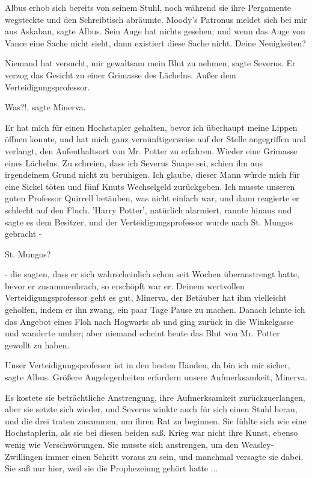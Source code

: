 Albus erhob sich bereits von seinem Stuhl, noch während sie ihre Pergamente
wegsteckte und den Schreibtisch abräumte. \glqq{}Moody's Patronus meldet sich bei
mir aus Askaban\grqq{}, sagte Albus. \glqq{}Sein Auge hat nichts gesehen; und
wenn das Auge von Vance eine Sache nicht sieht, dann existiert diese Sache
nicht. Deine Neuigkeiten?\grqq{}

\glqq{}Niemand hat versucht, mir gewaltsam mein Blut zu nehmen\grqq{}, sagte
Severus. Er verzog das Gesicht zu einer Grimasse des Lächelns. \glqq{}Außer dem
Verteidigungsprofessor.\grqq{}

\glqq{}Was?!\grqq{}, sagte Minerva.

\glqq{}Er hat mich für einen Hochstapler gehalten, bevor ich überhaupt meine
Lippen öffnen konnte, und hat mich ganz vernünftigerweise auf der Stelle
angegriffen und verlangt, den Aufenthaltsort von Mr. Potter zu erfahren.\grqq{}
Wieder eine Grimasse eines Lächelns. \glqq{}Zu schreien, dass ich Severus Snape
sei, schien ihn aus irgendeinem Grund nicht zu beruhigen. Ich glaube, dieser
Mann würde mich für eine Sickel töten und fünf Knuts Wechselgeld zurückgeben.
Ich musste unseren guten Professor Quirrell betäuben, was nicht einfach war, und
dann reagierte er schlecht auf den Fluch. 'Harry Potter', natürlich alarmiert,
rannte hinaus und sagte es dem Besitzer, und der Verteidigungsprofessor wurde
nach St. Mungos gebracht -\grqq{}

\glqq{}St. Mungos?\grqq{}

\glqq{}- die sagten, dass er sich wahrscheinlich schon seit Wochen überanstrengt
hatte, bevor er zusammenbrach, so erschöpft war er. Deinem wertvollen
Verteidigungsprofessor geht es gut, Minerva, der Betäuber hat ihm vielleicht
geholfen, indem er ihn zwang, ein paar Tage Pause zu machen. Danach lehnte ich
das Angebot eines Floh nach Hogwarts ab und ging zurück in die Winkelgasse und
wanderte umher; aber niemand scheint heute das Blut von Mr. Potter gewollt zu
haben.\grqq{}

\glqq{}Unser Verteidigungsprofessor ist in den besten Händen, da bin ich mir
sicher\grqq{}, sagte Albus. \glqq{}Größere Angelegenheiten erfordern unsere
Aufmerksamkeit, Minerva.\grqq{}

Es kostete sie beträchtliche Anstrengung, ihre Aufmerksamkeit zurückzuerlangen,
aber sie setzte sich wieder, und Severus winkte auch für sich einen Stuhl heran,
und die drei traten zusammen, um ihren Rat zu beginnen. Sie fühlte sich wie eine
Hochstaplerin, als sie bei diesen beiden saß. Krieg war nicht ihre Kunst, ebenso
wenig wie Verschwörungen. Sie musste sich anstrengen, um den Weasley-Zwillingen
immer einen Schritt voraus zu sein, und manchmal versagte sie dabei. Sie saß nur
hier, weil sie die Prophezeiung gehört hatte ...

